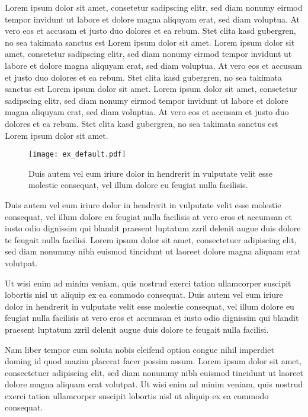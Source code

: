 \documentclass[twocolumn,floatfix]{revtex4-1}
\begin{document}
Lorem ipsum dolor sit amet, consetetur sadipscing elitr, sed diam nonumy eirmod tempor invidunt ut labore et dolore magna aliquyam erat, sed diam voluptua. At vero eos et accusam et justo duo dolores et ea rebum. Stet clita kasd gubergren, no sea takimata sanctus est Lorem ipsum dolor sit amet. Lorem ipsum dolor sit amet, consetetur sadipscing elitr, sed diam nonumy eirmod tempor invidunt ut labore et dolore magna aliquyam erat, sed diam voluptua. At vero eos et accusam et justo duo dolores et ea rebum. Stet clita kasd gubergren, no sea takimata sanctus est Lorem ipsum dolor sit amet. Lorem ipsum dolor sit amet, consetetur sadipscing elitr, sed diam nonumy eirmod tempor invidunt ut labore et dolore magna aliquyam erat, sed diam voluptua. At vero eos et accusam et justo duo dolores et ea rebum. Stet clita kasd gubergren, no sea takimata sanctus est Lorem ipsum dolor sit amet. 

\begin{figure}
\centering
\texttt{[image: ex\_default.pdf]}
\caption{
Duis autem vel eum iriure dolor in hendrerit in vulputate velit esse molestie consequat, vel illum dolore eu feugiat nulla facilisis. }
\end{figure}

Duis autem vel eum iriure dolor in hendrerit in vulputate velit esse molestie consequat, vel illum dolore eu feugiat nulla facilisis at vero eros et accumsan et iusto odio dignissim qui blandit praesent luptatum zzril delenit augue duis dolore te feugait nulla facilisi. Lorem ipsum dolor sit amet, consectetuer adipiscing elit, sed diam nonummy nibh euismod tincidunt ut laoreet dolore magna aliquam erat volutpat. 

Ut wisi enim ad minim veniam, quis nostrud exerci tation ullamcorper suscipit lobortis nisl ut aliquip ex ea commodo consequat. Duis autem vel eum iriure dolor in hendrerit in vulputate velit esse molestie consequat, vel illum dolore eu feugiat nulla facilisis at vero eros et accumsan et iusto odio dignissim qui blandit praesent luptatum zzril delenit augue duis dolore te feugait nulla facilisi. 

Nam liber tempor cum soluta nobis eleifend option congue nihil imperdiet doming id quod mazim placerat facer possim assum. Lorem ipsum dolor sit amet, consectetuer adipiscing elit, sed diam nonummy nibh euismod tincidunt ut laoreet dolore magna aliquam erat volutpat. Ut wisi enim ad minim veniam, quis nostrud exerci tation ullamcorper suscipit lobortis nisl ut aliquip ex ea commodo consequat. 
\end{document}

